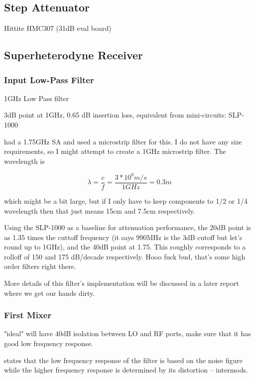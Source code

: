 \subsection{Step Attenuator}

\cite{qsl} Hittite HMC307 (31dB eval board)

\subsection{Superheterodyne Receiver}

\subsubsection{Input Low-Pass Filter}

1GHz Low Pass filter

\cite{qsl} 3dB point at 1GHz, 0.65 dB insertion loss, equivalent from
mini-circuits: SLP-1000

\cite{lea} had a 1.75GHz SA and used a microstrip filter for this. I do not have
any size requirements, so I might attempt to create a 1GHz microstrip filter.
The wavelength is

\begin{equation}
	\lambda = \frac{c}{f}
	= \frac{3*10^8 m/s}{1GHz}
	= 0.3m
\end{equation}

which might be a bit large, but if I only have to keep components to 1/2 or 1/4
wavelength then that just means 15cm and 7.5cm respectively.

Using the SLP-1000 as a baseline for attenuation performance, the 20dB point is
as 1.35 times the cuttoff frequency (it says 990MHz is the 3dB cutoff but let's
round up to 1GHz), and the 40dB point at 1.75. This roughly corresponds to a
rolloff of 150 and 175 dB/decade respectively. Hooo fuck bud, that's some high
order filters right there.

More details of this filter's implementation will be discussed in a later report
where we get our hands dirty.

\subsubsection{First Mixer}

\cite{qsl} "ideal" will have 40dB isolation between LO and RF ports, make sure
that it has good low frequency response.

\cite{lea} states that the low frequency response of the filter is based on the
noise figure while the higher frequency response is determined by its distortion
-- intermods.

